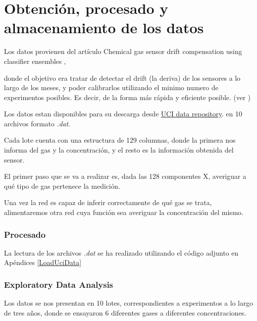 \chapter{Obtención, procesado y almacenamiento de los datos}


Los datos provienen del artículo  Chemical gas sensor drift compensation using classifier ensembles \cite{GasData},

donde el objetivo era tratar de detectar el drift (la deriva) de los sensores a lo largo de los meses, y poder calibrarlos
utilizando el minimo numero de experimentos posibles. Es decir, de la forma más rápida y eficiente posible.
(ver \cite{GasData})

Los datos estan disponibles para su descarga desde
\href{https://archive.ics.uci.edu/ml//datasets/Gas+Sensor+Array+Drift+Dataset#}{UCI data repository}.
en 10 archivos formato \emph{.dat}.

Cada lote cuenta con una estructura de 129 columnas, donde la primera nos informa del gas y la concentración,
y el resto es la información obtenida del sensor.

El primer paso que se va a realizar es, dada las 128 componentes X,
averiguar a qué tipo de gas pertenece la medición.

Una vez la red es capaz de inferir correctamente de qué gas se trata,
alimentaremos otra red cuya función
sea averiguar la concentración del mismo.

\subsection{Procesado}

La lectura de los archivos  \emph{.dat} se ha realizado utilizando
el código adjunto en Apéndices  \ref{LoadUciData}


\subsection{Exploratory Data Analysis}

Los datos se nos presentan en 10 lotes, correspondientes a experimentos a lo largo de tres años, donde se ensayaron
6 diferentes gases a diferentes concentraciones.

